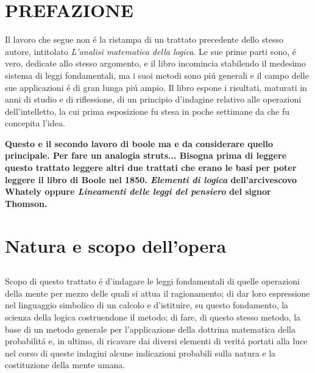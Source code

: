 \chapter*{PREFAZIONE}
Il lavoro che segue non \'{e} la ristampa di un trattato precedente dello stesso autore, intitolato \textit{L'analisi matematica della logica}. Le sue prime parti sono, \'{e} vero,
dedicate allo stesso argomento, e il libro incomincia stabilendo il medesimo sistema di leggi fondamentali, ma i suoi metodi sono pi\'{u} generali e il campo delle sue applicazioni
\'{e} di gran lunga pi\'{u} ampio. Il libro espone i risultati, maturati in anni di studio e di riflessione, di un principio d'indagine relativo alle operazioni dell'intelletto, la cui
prima esposizione fu stesa in poche settimane da che fu concepita l'idea.

\textbf{Questo e il secondo lavoro di boole ma e da considerare quello principale. Per fare un analogia struts... Bisogna prima di leggere questo trattato
  leggere altri due trattati che erano le basi per poter leggere il libro di Boole nel 1850.  
  \textit{Elementi di logica} dell'arcivescovo Whately oppure \textit{Lineamenti delle leggi del pensiero} del signor Thomson.
}

\chapter{Natura e scopo dell'opera}

\section{}
Scopo di questo trattato \'{e} d'indagare le leggi fondamentali di quelle operazioni della mente per mezzo delle quali si attua il ragionamento; di dar loro espressione nel linguaggio
simbolico di un calcolo e d'istituire, su questo fondamento, la scienza della logica costruendone il metodo; di fare, di questo stesso metodo, la base di un metodo generale per
l'applicazione della dottrina matematica della probabilit\'{a} e, in ultimo, di ricavare dai diversi elementi di verit\'{a} portati alla luce nel corso di queste indagini alcune
indicazioni probabili sulla natura e la costituzione della mente umana.

